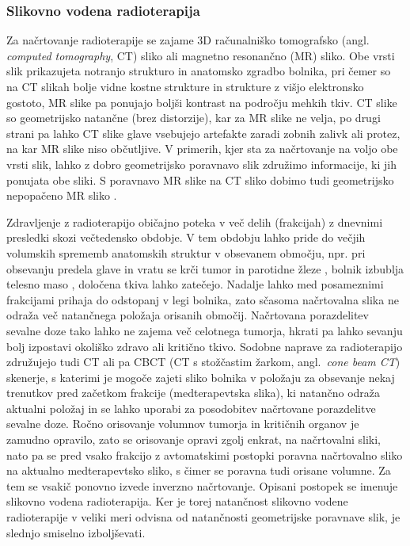 \documentclass[a4paper,twoside,11pt]{article}
\begin{document}
	\subsubsection*{Slikovno vodena radioterapija}
	\par{
	  Za načrtovanje radioterapije se zajame 3D računalniško tomografsko (angl. \emph{computed tomography}, CT) sliko ali magnetno resonančno (MR) sliko. Obe vrsti slik prikazujeta notranjo strukturo in anatomsko zgradbo bolnika, pri čemer so na CT slikah bolje vidne kostne strukture in strukture z višjo elektronsko gostoto, MR slike pa ponujajo boljši kontrast na področju mehkih tkiv. CT slike so geometrijsko natančne (brez distorzije), kar za MR slike ne velja, po drugi strani pa lahko CT slike glave vsebujejo artefakte zaradi zobnih zalivk ali protez, na kar MR slike niso občutljive. V primerih, kjer sta za načrtovanje na voljo obe vrsti slik, lahko z dobro geometrijsko poravnavo slik združimo informacije, ki jih ponujata obe sliki. S poravnavo MR slike na CT sliko dobimo tudi geometrijsko nepopačeno MR sliko \citep{brunt2010}.
	}
	\par{
	  Zdravljenje z radioterapijo običajno poteka v več delih (frakcijah) z dnevnimi presledki skozi večtedensko obdobje. V tem obdobju lahko pride do večjih volumskih sprememb anatomskih struktur v obsevanem območju, npr. pri obsevanju predela glave in vratu se krči tumor \citep{surucu2016} in parotidne žleze \citep{fiorentino2012}, bolnik izbublja telesno maso \citep{ottosson2013}, določena tkiva lahko zatečejo. Nadalje lahko med posameznimi frakcijami prihaja do odstopanj v legi bolnika, zato sčasoma načrtovalna slika ne odraža več natančnega položaja orisanih območij. Načrtovana porazdelitev sevalne doze tako lahko ne zajema več celotnega tumorja, hkrati pa lahko sevanju bolj izpostavi okoliško zdravo ali kritično tkivo. Sodobne naprave za radioterapijo združujejo tudi CT ali pa CBCT (CT s stožčastim žarkom, angl.~\emph{cone beam CT}) skenerje, s katerimi je mogoče zajeti sliko bolnika v položaju za obsevanje nekaj trenutkov pred začetkom frakcije (medterapevtska slika), ki natančno odraža aktualni položaj in se lahko uporabi za posodobitev načrtovane porazdelitve sevalne doze. Ročno orisovanje volumnov tumorja in kritičnih organov je zamudno opravilo, zato se orisovanje opravi zgolj enkrat, na načrtovalni sliki, nato pa se pred vsako frakcijo z avtomatskimi postopki poravna načrtovalno sliko na aktualno medterapevtsko sliko, s čimer se poravna tudi orisane volumne. Za tem se vsakič ponovno izvede inverzno načrtovanje. Opisani postopek se imenuje slikovno vodena radioterapija. Ker je torej natančnost slikovno vodene radioterapije v veliki meri odvisna od natančnosti geometrijske poravnave slik, je slednjo smiselno izboljševati.
	}
\end{document}
